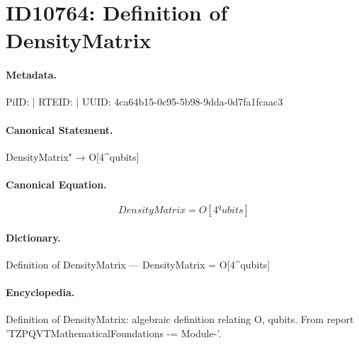 \section*{ID10764: Definition of DensityMatrix}
\paragraph{Metadata.}
PiID:  | RTEID:  | UUID: 4ca64b15-0c95-5b98-9dda-0d7fa1fcaac3

\paragraph{Canonical Statement.}
DensityMatrix" → O[4\textasciicircum{}qubits]

\paragraph{Canonical Equation.}
\[
DensityMatrix = O[4^qubits]
\]

\paragraph{Dictionary.}
Definition of DensityMatrix — DensityMatrix = O[4\textasciicircum{}qubits]

\paragraph{Encyclopedia.}
Definition of DensityMatrix: algebraic definition relating O, qubits. From report 'TZPQVTMathematicalFoundations -= Module-'.
